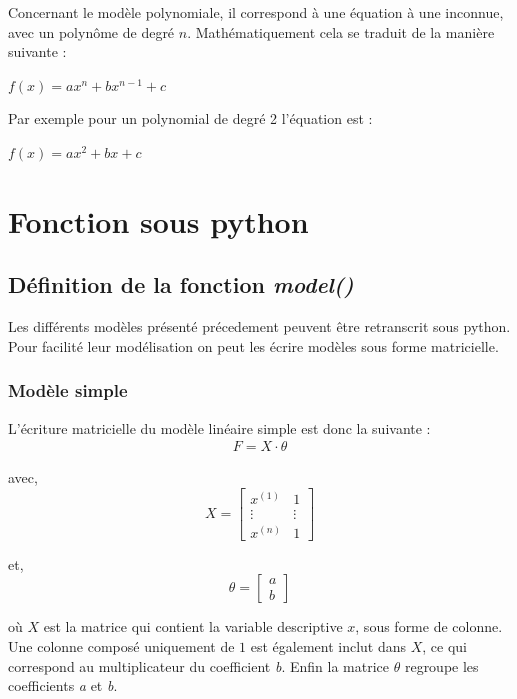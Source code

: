 \documentclass[french]{article}
\begin{document}
Concernant le modèle polynomiale, il correspond à une équation à une inconnue, avec un polynôme de degré $n$. Mathématiquement cela se traduit de la manière suivante :

\begin{center}
    $f(x) = ax^{n} + bx^{n-1} + c $
\end{center}

\noindent Par exemple pour un polynomial de degré 2 l'équation est :

\begin{center}
    $f(x) = ax^{2} + bx + c $
\end{center}

\newpage

\section{Fonction sous python}

\subsection{Définition de la fonction \textit{model()}}

Les différents modèles présenté précedement peuvent être retranscrit sous python. Pour facilité leur modélisation on peut les écrire modèles sous forme matricielle.

\subsubsection{Modèle simple}

\noindent L'écriture matricielle du modèle linéaire simple est donc la suivante :
\begin{align*}
    F = X \cdot \theta
\end{align*}

\noindent avec, 
$$X = \begin{bmatrix}
    x^{(1)} & 1 \\
    \vdots & \vdots \\
    x^{(n)} & 1
\end{bmatrix}$$

\noindent et, 
$$\theta = \begin{bmatrix}
    a \\
    b
\end{bmatrix}$$

\noindent où $X$ est la matrice qui contient la variable descriptive $x$, sous forme de colonne. Une colonne composé uniquement de $1$ est également inclut dans $X$, ce qui correspond au multiplicateur du coefficient \textit{b}. Enfin la matrice $\theta$ regroupe les coefficients \textit{a} et \textit{b}.
\end{document}
